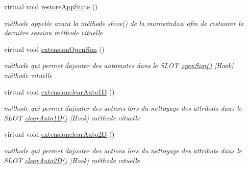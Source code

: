 \begin{DoxyCompactItemize}
virtual void \hyperlink{class_main_window_ab1dbe77cfb9a4876733a540614afdec0}{restore\+App\+State} ()
\begin{DoxyCompactList}\small\item\em méthode appelée avant la méthode show() de la mainwindow afin de restaurer la dernière session méthode vituelle \end{DoxyCompactList}\item 
virtual void \hyperlink{class_main_window_aec09ccd11397e7c8f83852ede698cf9c}{extension\+Open\+Sim} ()
\begin{DoxyCompactList}\small\item\em méthode qui permet d\textquotesingle{}ajouter des automates dans le S\+L\+OT \hyperlink{class_main_window_a13e1e518cda3c3ef508f319e5230a425}{open\+Sim()} \mbox{[}Hook\mbox{]} méthode vituelle \end{DoxyCompactList}\item 
virtual void \hyperlink{class_main_window_a51581d05a87d52c310c5232b4d05a2ea}{extensionclear\+Auto1D} ()
\begin{DoxyCompactList}\small\item\em méthode qui permet d\textquotesingle{}ajouter des actions lors du nettoyage des attributs dans le S\+L\+OT \hyperlink{class_main_window_a97b2dcddfafe0559b8b0e631f2bcf375}{clear\+Auto1\+D()} \mbox{[}Hook\mbox{]} méthode vituelle \end{DoxyCompactList}\item 
virtual void \hyperlink{class_main_window_a44411b6c7380592b08589b6edde6b5dc}{extensionclear\+Auto2D} ()
\begin{DoxyCompactList}\small\item\em méthode qui permet d\textquotesingle{}ajouter des actions lors du nettoyage des attributs dans le S\+L\+OT \hyperlink{class_main_window_a37e61e72d181b0a43900167b582caeb4}{clear\+Auto2\+D()} \mbox{[}Hook\mbox{]} méthode vituelle \end{DoxyCompactList}\end{DoxyCompactItemize}
